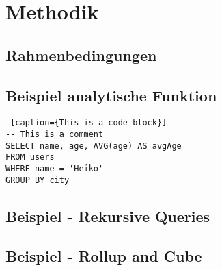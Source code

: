 \chapter{Methodik}

\section{Rahmenbedingungen}

\section{Beispiel analytische Funktion}

\begin{lstlisting} [caption={This is a code block}]
-- This is a comment
SELECT name, age, AVG(age) AS avgAge
FROM users
WHERE name = 'Heiko'
GROUP BY city
\end{lstlisting}

\section{Beispiel - Rekursive Queries}

\section{Beispiel - Rollup and Cube}
